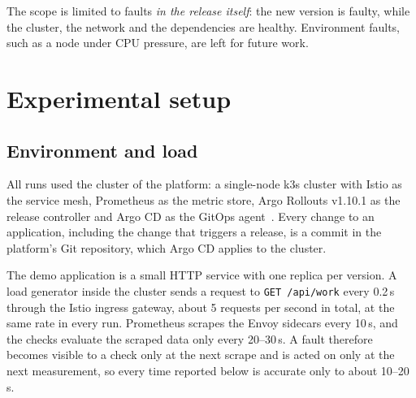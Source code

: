 The scope is limited to faults \emph{in the release itself}: the new version is faulty, while the cluster, the network and the dependencies are healthy. Environment faults, such as a node under CPU pressure, are left for future work.

\section{Experimental setup}
\label{sec:EvalSetup}

\subsection{Environment and load}
\label{sec:EvalEnvironment}
All runs used the cluster of the platform: a single-node k3s cluster with Istio as the service mesh, Prometheus as the metric store, Argo Rollouts v1.10.1 as the release controller and Argo CD as the GitOps agent~\cite{ArgoCD}. Every change to an application, including the change that triggers a release, is a commit in the platform's Git repository, which Argo CD applies to the cluster.

The demo application is a small HTTP service with one replica per version. A load generator inside the cluster sends a request to \texttt{GET /api/work} every 0.2\,s through the Istio ingress gateway, about 5 requests per second in total, at the same rate in every run. Prometheus scrapes the Envoy sidecars every 10\,s, and the checks evaluate the scraped data only every 20--30\,s. A fault therefore becomes visible to a check only at the next scrape and is acted on only at the next measurement, so every time reported below is accurate only to about 10--20\,s.

